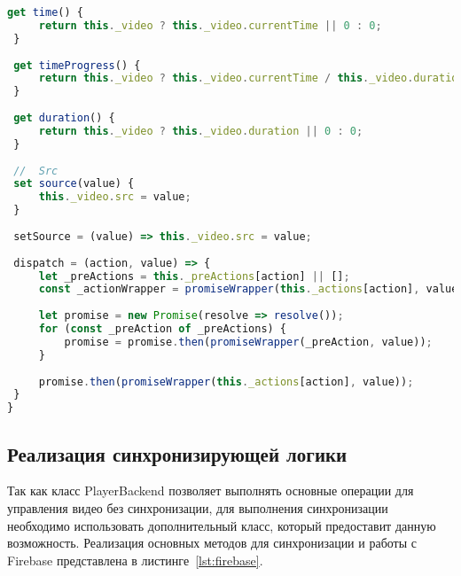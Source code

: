 \begin{lstlisting}[language=JavaScript,label={lst:playerback},caption={Класс PlayerBackend}]
 get time() {
     return this._video ? this._video.currentTime || 0 : 0;
 }
 
 get timeProgress() {
     return this._video ? this._video.currentTime / this._video.duration || 0 : 0;
 }
 
 get duration() {
     return this._video ? this._video.duration || 0 : 0;
 }
 
 //  Src
 set source(value) {
     this._video.src = value;
 }
 
 setSource = (value) => this._video.src = value;
 
 dispatch = (action, value) => {
     let _preActions = this._preActions[action] || [];
     const _actionWrapper = promiseWrapper(this._actions[action], value);
 
     let promise = new Promise(resolve => resolve());
     for (const _preAction of _preActions) {
         promise = promise.then(promiseWrapper(_preAction, value));
     }
 
     promise.then(promiseWrapper(this._actions[action], value));
 }
}
\end{lstlisting}

\subsection{Реализация синхронизирующей логики}
Так как класс PlayerBackend позволяет выполнять основные операции для управления видео без синхронизации, для выполнения синхронизации необходимо использовать дополнительный класс, который предоставит данную возможность. Реализация основных методов для синхронизации и работы с Firebase представлена в листинге~\ref{lst:firebase}. 

